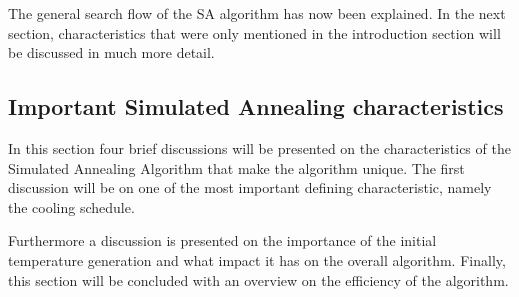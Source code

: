The general search flow of the SA algorithm has now been explained. In the next section, characteristics that were only mentioned in the introduction section will be discussed in much more detail.
\subsection{Important Simulated Annealing characteristics}
In this section four brief discussions will be presented on the characteristics of the Simulated Annealing Algorithm that make the algorithm unique. The first discussion will be on one of the most important defining characteristic, namely the cooling schedule. 

Furthermore a discussion is presented on the importance of the initial temperature generation and what impact it has on the overall algorithm. Finally, this section will be concluded with an overview on the efficiency of the algorithm.

